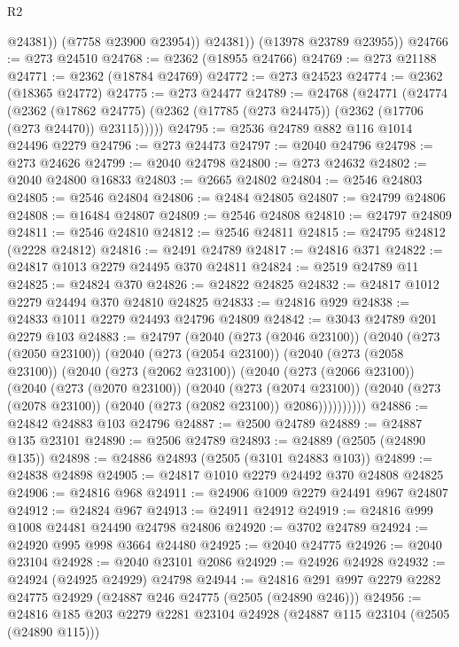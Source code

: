 \begin{lexlean}{R2}
\begin{coremodule}
                @24381))
            (@7758 @23900 @23954))
          @24381))
      (@13978 @23789 @23955))
@24766 := @273 @24510
@24768 := @2362 (@18955 @24766)
@24769 := @273 @21188
@24771 := @2362 (@18784 @24769)
@24772 := @273 @24523
@24774 := @2362 (@18365 @24772)
@24775 := @273 @24477
@24789 := @24768
    (@24771
      (@24774
        (@2362
          (@17862 @24775)
          (@2362 (@17785 (@273 @24475)) (@2362 (@17706 (@273 @24470)) @23115)))))
@24795 := @2536 @24789 @882 @116 @1014 @24496 @2279
@24796 := @273 @24473
@24797 := @2040 @24796
@24798 := @273 @24626
@24799 := @2040 @24798
@24800 := @273 @24632
@24802 := @2040 @24800 @16833
@24803 := @2665 @24802
@24804 := @2546 @24803
@24805 := @2546 @24804
@24806 := @2484 @24805
@24807 := @24799 @24806
@24808 := @16484 @24807
@24809 := @2546 @24808
@24810 := @24797 @24809
@24811 := @2546 @24810
@24812 := @2546 @24811
@24815 := @24795 @24812 (@2228 @24812)
@24816 := @2491 @24789
@24817 := @24816 @371
@24822 := @24817 @1013 @2279 @24495 @370 @24811
@24824 := @2519 @24789 @11
@24825 := @24824 @370
@24826 := @24822 @24825
@24832 := @24817 @1012 @2279 @24494 @370 @24810 @24825
@24833 := @24816 @929
@24838 := @24833 @1011 @2279 @24493 @24796 @24809
@24842 := @3043 @24789 @201 @2279 @103
@24883 := @24797
    (@2040
      (@273 (@2046 @23100))
      (@2040
        (@273 (@2050 @23100))
        (@2040
          (@273 (@2054 @23100))
          (@2040
            (@273 (@2058 @23100))
            (@2040
              (@273 (@2062 @23100))
              (@2040
                (@273 (@2066 @23100))
                (@2040
                  (@273 (@2070 @23100))
                  (@2040
                    (@273 (@2074 @23100))
                    (@2040 (@273 (@2078 @23100)) (@2040 (@273 (@2082 @23100)) @2086))))))))))
@24886 := @24842 @24883 @103 @24796
@24887 := @2500 @24789
@24889 := @24887 @135 @23101
@24890 := @2506 @24789
@24893 := @24889 (@2505 (@24890 @135))
@24898 := @24886 @24893 (@2505 (@3101 @24883 @103))
@24899 := @24838 @24898
@24905 := @24817 @1010 @2279 @24492 @370 @24808 @24825
@24906 := @24816 @968
@24911 := @24906 @1009 @2279 @24491 @967 @24807
@24912 := @24824 @967
@24913 := @24911 @24912
@24919 := @24816 @999 @1008 @24481 @24490 @24798 @24806
@24920 := @3702 @24789
@24924 := @24920 @995 @998 @3664 @24480
@24925 := @2040 @24775
@24926 := @2040 @23104
@24928 := @2040 @23101 @2086
@24929 := @24926 @24928
@24932 := @24924 (@24925 @24929) @24798
@24944 := @24816 @291 @997 @2279 @2282 @24775 @24929 (@24887 @246 @24775 (@2505 (@24890 @246)))
@24956 := @24816 @185 @203 @2279 @2281 @23104 @24928 (@24887 @115 @23104 (@2505 (@24890 @115)))

\end{coremodule}
\end{lexlean}
